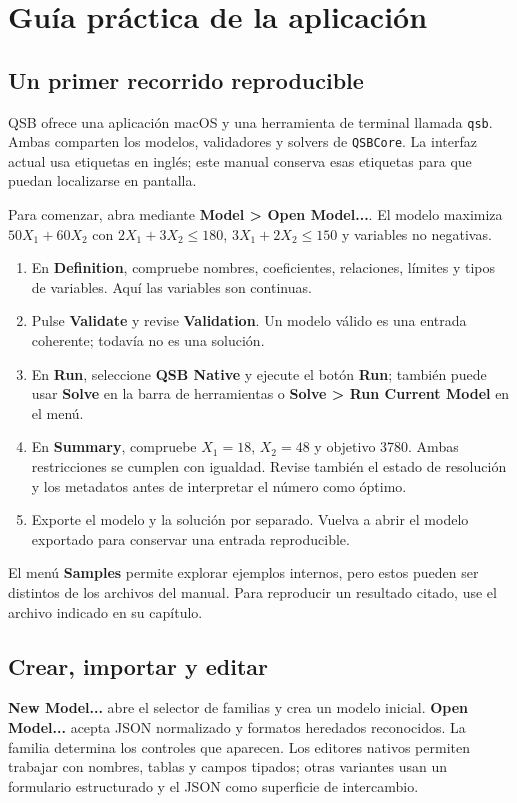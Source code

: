 \chapter{Guía práctica de la aplicación}
\label{chap:guia}

\section{Un primer recorrido reproducible}
QSB ofrece una aplicación macOS y una herramienta de terminal llamada
\texttt{qsb}. Ambas comparten los modelos, validadores y solvers de
\texttt{QSBCore}. La interfaz actual usa etiquetas en inglés; este manual
conserva esas etiquetas para que puedan localizarse en pantalla.

Para comenzar, abra  mediante
\textbf{Model > Open Model...}. El modelo maximiza $50X_1+60X_2$ con
$2X_1+3X_2\leq180$, $3X_1+2X_2\leq150$ y variables no negativas.
\begin{enumerate}
 \item En \textbf{Definition}, compruebe nombres, coeficientes, relaciones,
 límites y tipos de variables. Aquí las variables son continuas.
 \item Pulse \textbf{Validate} y revise \textbf{Validation}. Un modelo válido
 es una entrada coherente; todavía no es una solución.
 \item En \textbf{Run}, seleccione \textbf{QSB Native} y ejecute
 el botón \textbf{Run}; también puede usar \textbf{Solve} en la barra
 de herramientas o \textbf{Solve > Run Current Model} en el menú.
 \item En \textbf{Summary}, compruebe $X_1=18$, $X_2=48$ y objetivo 3780.
 Ambas restricciones se cumplen con igualdad. Revise también el estado de
 resolución y los metadatos antes de interpretar el número como óptimo.
 \item Exporte el modelo y la solución por separado. Vuelva a abrir el modelo
 exportado para conservar una entrada reproducible.
\end{enumerate}
El menú \textbf{Samples} permite explorar ejemplos internos, pero estos pueden
ser distintos de los archivos del manual. Para reproducir un resultado citado,
use el archivo indicado en su capítulo.

\section{Crear, importar y editar}
\textbf{New Model...} abre el selector de familias y crea un modelo inicial.
\textbf{Open Model...} acepta JSON normalizado y formatos heredados reconocidos.
La familia determina los controles que aparecen. Los editores nativos permiten
trabajar con nombres, tablas y campos tipados; otras variantes usan un formulario
estructurado y el JSON como superficie de intercambio.

